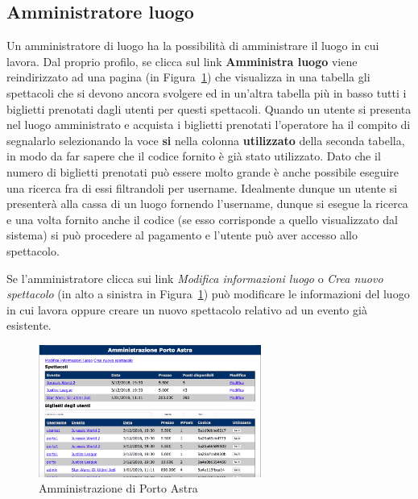 \documentclass[10pt, a4paper]{article}
\begin{document}
\subsection{Amministratore luogo}
Un amministratore di luogo ha la possibilità di amministrare il luogo in cui lavora.
Dal proprio profilo, se clicca sul link \textbf{Amministra luogo} viene reindirizzato ad una pagina 
(in Figura~\ref{fig:amministrazione_porto}) che visualizza in una tabella gli spettacoli che si devono 
ancora svolgere ed in un'altra tabella più in basso tutti i biglietti prenotati dagli utenti per questi spettacoli.
Quando un utente si presenta nel luogo amministrato e acquista i biglietti prenotati
l'operatore ha il compito di segnalarlo selezionando la voce \textbf{si} nella colonna 
\textbf{utilizzato} della seconda tabella, in modo da far sapere che il codice fornito è già
stato utilizzato. Dato che il numero di biglietti prenotati può essere molto grande è anche possibile eseguire una ricerca fra di essi filtrandoli per username. Idealmente dunque un utente si presenterà alla cassa di un luogo fornendo l'username, dunque si esegue la ricerca e una volta fornito anche il codice (se esso corrisponde a quello visualizzato dal sistema) si può procedere al pagamento e l'utente può aver accesso allo spettacolo.

Se l'amministratore clicca sui link  \textit{Modifica informazioni luogo} o
\textit{Crea nuovo spettacolo} (in alto a sinistra in Figura~\ref{fig:amministrazione_porto})
può modificare le informazioni del luogo in cui lavora oppure creare un nuovo spettacolo
relativo ad un evento già esistente.

\begin{figure}[h!]
	\centering
	\includegraphics[width=0.65\textwidth]{Images/amministrazione_porto.png}
	\caption{Amministrazione di Porto Astra}
	\label{fig:amministrazione_porto}
\end{figure}

\end{document}
